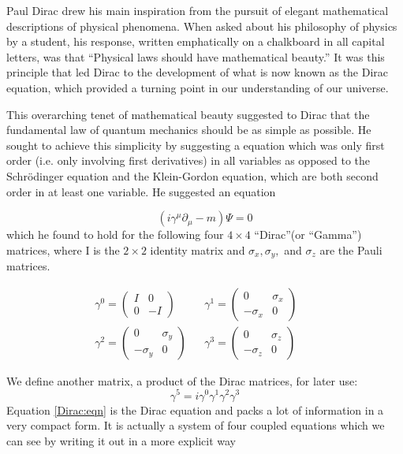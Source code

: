 \documentclass[a4paper,12pt]{book}
\begin{document}
Paul Dirac drew his main inspiration from the pursuit of elegant mathematical descriptions of physical phenomena. When asked about his philosophy of physics by a student, his response, written emphatically on a chalkboard in all capital letters, was that ``Physical laws should have mathematical beauty.'' It was this principle that led Dirac to the development of what is now known as the Dirac equation, which provided a turning point in our understanding of our universe\cite{gottfried}. 

This overarching tenet of mathematical beauty suggested to Dirac that the fundamental law of quantum mechanics should be as simple as possible. He sought to achieve this simplicity by suggesting a equation which was only first order (i.e. only involving first derivatives) in all variables as opposed to the Schr\"{o}dinger equation and the Klein-Gordon equation, which are both second order in at least one variable. He suggested an equation 

\begin{equation}\label{Dirac:eqn}
\boxed{
(i\gamma^{\mu}\partial_{\mu}-m)\Psi=0
}
\end{equation}
which he found to hold for the following four $4\times 4$ ``Dirac''(or ``Gamma'') matrices, where I is the $2\times 2$ identity matrix and $\sigma_{x},\sigma_{y},$ and $\sigma_{z}$ are the Pauli matrices.

\begin{align}
\gamma^{0}=\left( \begin{array}{cc}
I & 0 \\
0 & -I \end{array} \right) &&
\gamma^{1}=\left( \begin{array}{cc}
0 & \sigma_{x} \\
-\sigma_{x} & 0 \end{array} \right) && \\
\gamma^{2}=\left( \begin{array}{cc}
0 & \sigma_{y} \\
-\sigma_{y} & 0 \end{array} \right) &&
\gamma^{3}=\left( \begin{array}{cc}
0 & \sigma_{z} \\
-\sigma_{z} & 0 \end{array} \right)
\end{align}

We define another matrix, a product of the Dirac matrices, for later use:
\begin{equation}
\gamma^{5}=i\gamma^{0}\gamma^{1}\gamma^{2}\gamma^{3}
\end{equation}
Equation \ref{Dirac:eqn} is the Dirac equation and packs a lot of information in a very compact form. It is actually a system of four coupled equations which we can see by writing it out in a more explicit way
\end{document}
